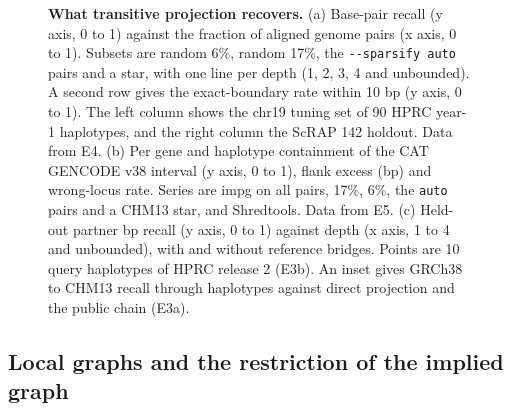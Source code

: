 \begin{figure}[!tpb]
\centering
{}
\caption[What transitive projection recovers]{\textbf{What transitive projection recovers.}
(a) Base-pair recall (y axis, 0 to 1) against the fraction of aligned genome pairs (x axis, 0 to 1).
Subsets are random 6\%, random 17\%, the \texttt{-{}-sparsify auto} pairs and a star, with one line per depth (1, 2, 3, 4 and unbounded).
A second row gives the exact-boundary rate within 10 bp (y axis, 0 to 1).
The left column shows the chr19 tuning set of 90 HPRC year-1 haplotypes, and the right column the ScRAP 142 holdout.
Data from E4.
(b) Per gene and haplotype containment of the CAT GENCODE v38 interval (y axis, 0 to 1), flank excess (bp) and wrong-locus rate.
Series are impg on all pairs, 17\%, 6\%, the \texttt{auto} pairs and a CHM13 star, and Shredtools.
Data from E5.
(c) Held-out partner bp recall (y axis, 0 to 1) against depth (x axis, 1 to 4 and unbounded), with and without reference bridges.
Points are 10 query haplotypes of HPRC release 2 (E3b).
An inset gives GRCh38 to CHM13 recall through haplotypes against direct projection and the public chain (E3a).}
\label{fig:recall}
\end{figure}

\subsection{Local graphs and the restriction of the implied graph}
\label{sec:res-local}

